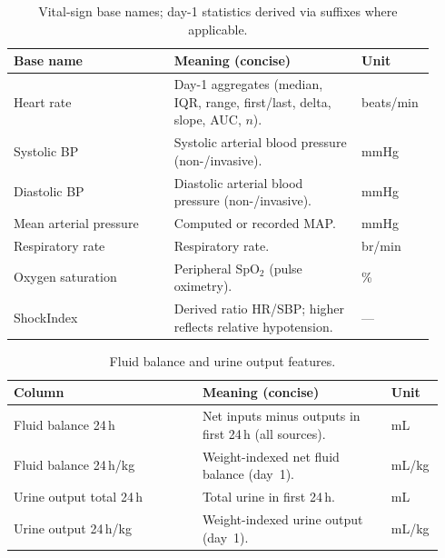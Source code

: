 \vspace{0.75\baselineskip}
\begin{table}[t]\centering
{\small\renewcommand{\arraystretch}{1.12}\setlength{\tabcolsep}{6pt}%
\caption{Vital-sign base names; day-1 statistics derived via suffixes where applicable.}
\label{app:tab-vitals}
\begin{tabular}{P{0.36\linewidth} P{0.42\linewidth} P{0.14\linewidth}}
\toprule
\textbf{Base name} & \textbf{Meaning (concise)} & \textbf{Unit}\\
\midrule
Heart rate & Day-1 aggregates (median, IQR, range, first/last, delta, slope, AUC, $n$). & beats/min\\
Systolic BP & Systolic arterial blood pressure (non-/invasive). & mmHg\\
Diastolic BP & Diastolic arterial blood pressure (non-/invasive). & mmHg\\
Mean arterial pressure & Computed or recorded MAP. & mmHg\\
Respiratory rate & Respiratory rate. & br/min\\
Oxygen saturation & Peripheral SpO$_2$ (pulse oximetry). & \%\\
ShockIndex & Derived ratio HR/SBP; higher reflects relative hypotension. & ---\\
\bottomrule
\end{tabular}}
\end{table}

\vspace{0.75\baselineskip}
\begin{table}[t]\centering
{\small\renewcommand{\arraystretch}{1.12}\setlength{\tabcolsep}{6pt}%
\caption{Fluid balance and urine output features.}
\label{app:tab-fluids-uo}
\begin{tabular}{P{0.42\linewidth} P{0.42\linewidth} P{0.10\linewidth}}
\toprule
\textbf{Column} & \textbf{Meaning (concise)} & \textbf{Unit}\\
\midrule
Fluid balance 24\,h & Net inputs minus outputs in first 24\,h (all sources). & mL\\
Fluid balance 24\,h/kg & Weight-indexed net fluid balance (day~1). & mL/kg\\
Urine output total 24\,h & Total urine in first 24\,h. & mL\\
Urine output 24\,h/kg & Weight-indexed urine output (day~1). & mL/kg\\
\bottomrule
\end{tabular}}
\end{table}

